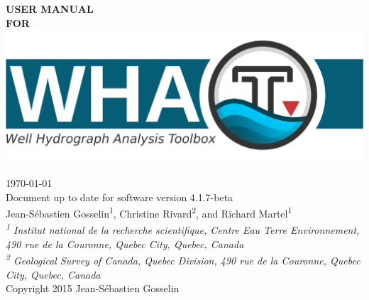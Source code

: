 \documentclass[WHATMANUAL.tex]{subfiles}
\begin{document}

\textbf{\fontsize{65}{36}\selectfont USER MANUAL}\\[1.5cm]
\textbf{\fontsize{65}{36}\selectfont FOR}\\


\includegraphics[width=1\textwidth]{WHAT_banner}~\\[2cm]

{\Large \today}\\[0.5cm]
{\Large Document up to date for software version 4.1.7-beta}\\[2cm]

{\large Jean-S\'ebastien Gosselin\textsuperscript{1}, Christine Rivard\textsuperscript{2}, and Richard Martel\textsuperscript{1}}\\[0.25cm]

\textit{{\small\textsuperscript{1} Institut national de la recherche scientifique, Centre Eau Terre Environnement, 490 rue de la Couronne, Quebec City, Quebec, Canada}}\\[0.1cm]

\textit{{\small\textsuperscript{2} Geological Survey of Canada, Quebec Division, 490 rue de la Couronne, Quebec City, Quebec, Canada}}\\[2cm]

{Copyright 2015 Jean-S\'ebastien Gosselin}
\end{document}
